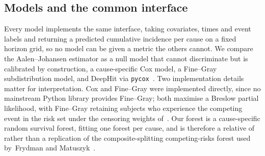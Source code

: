 \documentclass[11pt,journal]{IEEEtran}
\begin{document}
\subsection{Models and the common interface}
Every model implements the same interface, taking covariates, times and event
labels and returning a predicted cumulative incidence per cause on a fixed
horizon grid, so no model can be given a metric the others cannot. We compare the
Aalen--Johansen estimator as a null model that cannot discriminate but is
calibrated by construction, a cause-specific Cox model, a Fine--Gray
subdistribution model, and DeepHit via
\texttt{pycox}~\cite{DBLP:journals/jmlr/KvammeBS19}. Two implementation details
matter for interpretation. Cox and Fine--Gray were implemented directly,
since no mainstream Python library provides Fine--Gray; both maximise a Breslow
partial likelihood, with Fine--Gray retaining subjects who experience the
competing event in the risk set under the censoring weights
of~\cite{finegray1999subdistribution}. Our forest is a cause-specific random
survival forest, fitting one forest per cause, and is therefore a relative of
rather than a replication of the composite-splitting competing-risks forest used
by~Frydman and Matuszyk~\cite{DBLP:journals/jors/FrydmanM22}.
\end{document}
